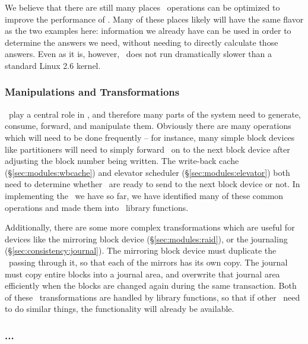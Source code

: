 We believe that there are still many places \chdesc\ operations can be
optimized to improve the performance of \Kudos. Many of these places likely
will have the same flavor as the two examples here: information we already have
can be used in order to determine the answers we need, without needing to
directly calculate those answers. Even as it is, however, \Kudos\ does not run
dramatically slower than a standard Linux 2.6 kernel.

\subsubsection {Manipulations and Transformations}
\Chdescs\ play a central role in \Kudos, and therefore many parts of the system
need to generate, consume, forward, and manipulate them. Obviously there are
many operations which will need to be done frequently -- for instance, many
simple block devices like partitioners will need to simply forward \chdescs\ on
to the next block device after adjusting the block number being written. The
write-back cache (\S\ref{sec:modules:wbcache}) and elevator scheduler
(\S\ref{sec:modules:elevator}) both need to determine whether \chdescs\ are
ready to send to the next block device or not. In implementing the \modules\ we
have so far, we have identified many of these common operations and made them
into \chdesc\ library functions.

Additionally, there are some more complex transformations which are useful for
devices like the mirroring block device (\S\ref{sec:modules:raid}), or the
journaling \module (\S\ref{sec:consistency:journal}). The mirroring block device
must duplicate the \chdescs\ passing through it, so that each of the mirrors has
its own copy. The journal must copy entire blocks into a journal area, and
overwrite that journal area efficiently when the blocks are changed again during
the same transaction. Both of these \chdesc\ transformations are handled by
library functions, so that if other \modules\ need to do similar things, the
functionality will already be available.

\subsubsection {...}
